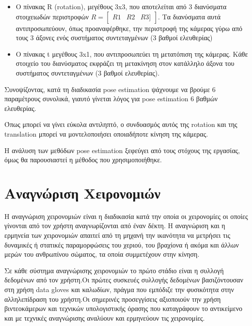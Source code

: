 \begin{itemize}
\item Ο πίνακας R (rotation), μεγέθους 3x3, που αποτελείται από 3 διανύσματα στοιχειωδών περιστροφών $R=\begin{bmatrix} R1 & R2 & R3 ] \end{bmatrix}$. Τα διανύσματα αυτά αντιπροσωπεύουν, όπως προαναφέρθηκε, την περιστροφή της κάμερας γύρω από τους 3 άξονες ενός συστήματος συντεταγμένων (3 βαθμοί ελευθερίας)
\item Ο πίνακας t μεγέθους 3x1, που αντιπροσωπεύει τη μετατόπιση της κάμερας. Κάθε στοιχείο του διανύσματος εκφράζει τη μετακίνηση στον κατάλληλο άξονα του συστήματος συντεταγμένων (3 βαθμοί ελευθερίας).
\end{itemize}


Συνοψίζοντας, κατά τη διαδικασία pose estimation ψάχνουμε να βρούμε 6 παραμέτρους συνολικά, γιαυτό γίνεται λόγος για pose estimation 6 βαθμών ελευθερίας.

Όπως μπορεί να γίνει εύκολα αντιληπτό, ο συνδυασμός αυτός της rotation και της translation μπορεί να μοντελοποιήσει οποιαδήποτε κίνηση της κάμερας.


Η ανάλυση των μεθόδων pose estimation ξεφεύγει από τους στόχους της εργασίας, όμως θα παρουσιαστεί η μέθοδος που χρησιμοποιήθηκε.












\section{Αναγνώριση Χειρονομιών}



H αναγνώριση χειρονομιών είναι η διαδικασία κατά την οποία οι χειρονομίες οι οποίες γίνονται από τον χρήστη αναγνωρίζονται από έναν δέκτη. Η αναγνώριση και η ερμηνεία των χειρονομιών απαιτεί από τη μηχανή την ικανότητα να μετρήσει τις δυναμικές ή στατικές παραμορφώσεις του χεριού, του βραχίονα ή ακόμα και άλλων μερών του ανθρωπίνου σώματος, τα οποία συμμετέχουν στην κίνηση.

Σε κάθε σύστημα αναγνώρισης χειρονομιών το πρώτο στάδιο είναι η συλλογή δεδομένων από τον χρήστη.Οι πρώτες συσκευές συλλογής δεδομένων βασιζόντουσαν στη χρήση data gloves και καλωδίων, πράγμα που εμπόδιζε την φυσικότητα στην αλληλεπίδραση του χρήστη.Οι σημερινές προσεγγίσεις αξιοποιούν την χρήση βιντεοκάμερων και τεχνικών υπολογιστικής όρασης που καταγράφουν το αντικείμενο και με τεχνικές αναγνώρισης αναλύουν και ερμηνεύουν τις χειρονομίες.

